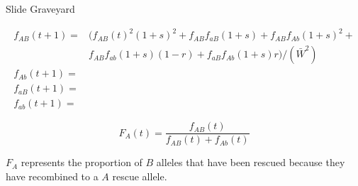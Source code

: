 \documentclass{beamer}
\begin{document}
\begin{frame}{Slide Graveyard}


    \begin{equation*}
    \begin{aligned}
        f_{AB}(t+1)= &(f_{AB}(t)^2(1+s)^2+f_{AB}f_{aB}(1+s)+f_{AB}f_{Ab}(1+s)^2+ \\
        &f_{AB}f_{ab}(1+s)(1-r)+f_{aB}f_{Ab}(1+s)r)/(\bar{W}^2) \\
        f_{Ab}(t+1)=    \\
        f_{aB}(t+1)=    \\
        f_{ab}(t+1)=
        \end{aligned}
    \end{equation*}
    
\begin{equation*}
    F_A(t)= \frac{f_{AB}(t)}{f_{AB}(t)+f_{Ab}(t)}
\end{equation*}

$F_A$ represents the proportion of $B$ alleles that have been rescued because they have recombined to a $A$ rescue allele.


\end{frame}
\end{document}

